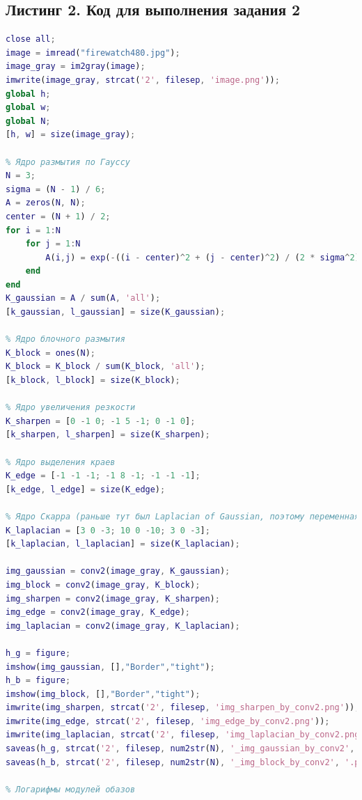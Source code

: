 \documentclass[a4paper]{article}
\begin{document}
\subsection*{Листинг 2. Код для выполнения задания 2}

\begin{lstlisting}[caption={Код для построения графиков для задания 2}, language=matlab]
close all;
image = imread("firewatch480.jpg");
image_gray = im2gray(image);
imwrite(image_gray, strcat('2', filesep, 'image.png'));
global h;
global w;
global N;
[h, w] = size(image_gray);

% Ядро размытия по Гауссу
N = 3;
sigma = (N - 1) / 6;
A = zeros(N, N);
center = (N + 1) / 2;
for i = 1:N
    for j = 1:N
        A(i,j) = exp(-((i - center)^2 + (j - center)^2) / (2 * sigma^2));
    end
end
K_gaussian = A / sum(A, 'all');
[k_gaussian, l_gaussian] = size(K_gaussian); 

% Ядро блочного размытия
K_block = ones(N);
K_block = K_block / sum(K_block, 'all');
[k_block, l_block] = size(K_block); 

% Ядро увеличения резкости
K_sharpen = [0 -1 0; -1 5 -1; 0 -1 0];
[k_sharpen, l_sharpen] = size(K_sharpen); 

% Ядро выделения краев
K_edge = [-1 -1 -1; -1 8 -1; -1 -1 -1];
[k_edge, l_edge] = size(K_edge); 

% Ядро Скарра (раньше тут был Laplacian of Gaussian, поэтому переменная названа так)
K_laplacian = [3 0 -3; 10 0 -10; 3 0 -3];
[k_laplacian, l_laplacian] = size(K_laplacian); 

img_gaussian = conv2(image_gray, K_gaussian);
img_block = conv2(image_gray, K_block);
img_sharpen = conv2(image_gray, K_sharpen);
img_edge = conv2(image_gray, K_edge);
img_laplacian = conv2(image_gray, K_laplacian);

h_g = figure;
imshow(img_gaussian, [],"Border","tight");
h_b = figure;
imshow(img_block, [],"Border","tight");
imwrite(img_sharpen, strcat('2', filesep, 'img_sharpen_by_conv2.png'));
imwrite(img_edge, strcat('2', filesep, 'img_edge_by_conv2.png'));
imwrite(img_laplacian, strcat('2', filesep, 'img_laplacian_by_conv2.png'));
saveas(h_g, strcat('2', filesep, num2str(N), '_img_gaussian_by_conv2', '.png'), 'png')
saveas(h_b, strcat('2', filesep, num2str(N), '_img_block_by_conv2', '.png'), 'png')

% Логарифмы модулей обазов


\end{lstlisting}
\end{document}
